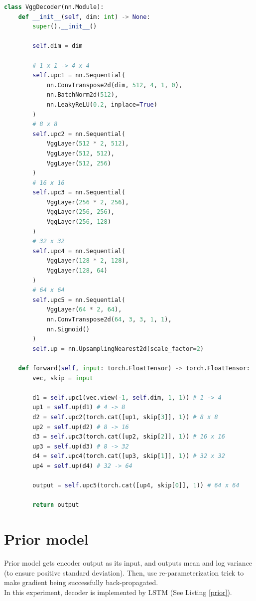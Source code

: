 \begin{lstlisting}[language=Python, caption={Python code of \textcolor{blue}{\textbf{VggDecoder}}.}, label={decoder}]
class VggDecoder(nn.Module):
    def __init__(self, dim: int) -> None:
        super().__init__()
        
        self.dim = dim
        
        # 1 x 1 -> 4 x 4
        self.upc1 = nn.Sequential(
            nn.ConvTranspose2d(dim, 512, 4, 1, 0),
            nn.BatchNorm2d(512),
            nn.LeakyReLU(0.2, inplace=True)
        )
        # 8 x 8
        self.upc2 = nn.Sequential(
            VggLayer(512 * 2, 512),
            VggLayer(512, 512),
            VggLayer(512, 256)
        )
        # 16 x 16
        self.upc3 = nn.Sequential(
            VggLayer(256 * 2, 256),
            VggLayer(256, 256),
            VggLayer(256, 128)
        )
        # 32 x 32
        self.upc4 = nn.Sequential(
            VggLayer(128 * 2, 128),
            VggLayer(128, 64)
        )
        # 64 x 64
        self.upc5 = nn.Sequential(
            VggLayer(64 * 2, 64),
            nn.ConvTranspose2d(64, 3, 3, 1, 1),
            nn.Sigmoid()
        )
        self.up = nn.UpsamplingNearest2d(scale_factor=2)

    def forward(self, input: torch.FloatTensor) -> torch.FloatTensor:
        vec, skip = input 
        
        d1 = self.upc1(vec.view(-1, self.dim, 1, 1)) # 1 -> 4
        up1 = self.up(d1) # 4 -> 8
        d2 = self.upc2(torch.cat([up1, skip[3]], 1)) # 8 x 8
        up2 = self.up(d2) # 8 -> 16 
        d3 = self.upc3(torch.cat([up2, skip[2]], 1)) # 16 x 16 
        up3 = self.up(d3) # 8 -> 32 
        d4 = self.upc4(torch.cat([up3, skip[1]], 1)) # 32 x 32
        up4 = self.up(d4) # 32 -> 64
        
        output = self.upc5(torch.cat([up4, skip[0]], 1)) # 64 x 64
        
        return output\end{lstlisting}

\section{Prior model}
\indent
    Prior model gets encoder output as its input, 
    and outputs mean and log variance (to ensure positive standard deviation). 
    Then, use re-parameterization trick to make gradient being successfully back-propagated. \\
    In this experiment, decoder is implemented by LSTM (See Listing \ref{prior}).

